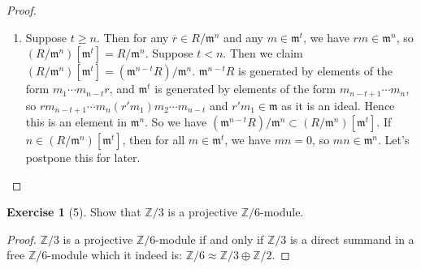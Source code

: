 \documentclass[reqno]{amsart}
\theoremstyle{definition}
\newtheorem{exercise}[theorem]{Exercise}
\theoremstyle{remark}
\begin{document}
\begin{proof}
\begin{enumerate}
            \item
                Suppose $t \ge n$. Then
                for any $\overline{r} \in 
                R / \mathfrak{m}^{n}$ and
                any $m \in \mathfrak{m}^{t}$, we have
                $rm \in \mathfrak{m}^{n}$, so
                $\left( R / \mathfrak{m}^{n} \right) 
                \left[ \mathfrak{m}^{t} \right] 
                = R / \mathfrak{m}^{n}$.
                Suppose $t < n$. Then
                we claim
                $\left( R / \mathfrak{m}^{n} \right) 
                \left[ \mathfrak{m}^{t} \right] 
                = \left( \mathfrak{m}^{n-t}R \right) /
                \mathfrak{m}^{n}$. 
                $\mathfrak{m}^{n-t}R$ is generated
                by elements of the form
                $m_1 \cdots m_{n-t}r$, and
                $\mathfrak{m}^{t}$ is generated by
                elements of the form
                $m_{n-t+1} \cdots m_{n}$, so
                $r m_{n-t+1} \cdots m_n
                (r'm_1) m_2 \cdots m_{n-t}$ and
                $r' m_1 \in \mathfrak{m}$ as it is an ideal.
                Hence this is an element in
                $\mathfrak{m}^{n}$. So
                we have $\left( \mathfrak{m}^{n-t}R \right) /
                \mathfrak{m}^{n} \subset 
                \left( R / \mathfrak{m}^{n} 
                \right) \left[ \mathfrak{m}^{t} \right] $.
                If
                $n \in \left( R / \mathfrak{m}^{n} \right) 
                \left[ \mathfrak{m}^{t} \right] $, then
                for all  $m \in \mathfrak{m}^{t}$, we have
                $m n = 0$, so
                $mn \in \mathfrak{m}^{n}$.
                Let's postpone this for later.

                \todo{}

        \end{enumerate}
    \end{proof}

    \begin{exercise}[5]
        Show that $\mathbb{Z} / 3 $ is a projective
        $\mathbb{Z} /6$-module.
    \end{exercise}

    \begin{proof}
        $\mathbb{Z} /3$ is a projective
        $\mathbb{Z} / 6$-module if and only if
        $\mathbb{Z} / 3$ is a direct summand in a 
        free $\mathbb{Z} / 6$-module which it indeed is:
        $\mathbb{Z} / 6 \approx \mathbb{Z} / 3 \oplus
        \mathbb{Z} / 2$.
    \end{proof}

    











\end{document}
